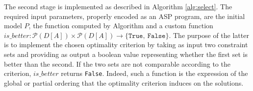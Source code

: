 
The second stage is implemented as described in Algorithm \ref{alg:select}. The required input parameters, properly encoded as an \ac{ASP} program, are the initial model $P$, the \textit{\sheriff} function computed by Algorithm \label{alg:cand} and a custom function ${is\_better}:\mathcal{P}({D[A]})\times\mathcal{P}({D[A]})\rightarrow \{\texttt{True},\ \texttt{False}\}$. The purpose of the latter is to implement the chosen optimality criterion by taking as input two constraint sets and providing as output a boolean value representing whether the first set is better than the second. If the two sets are not comparable according to the criterion, ${is\_better}$ returns \texttt{False}. Indeed, such a function is the expression of the global or partial ordering that the optimality criterion induces on the solutions. 




